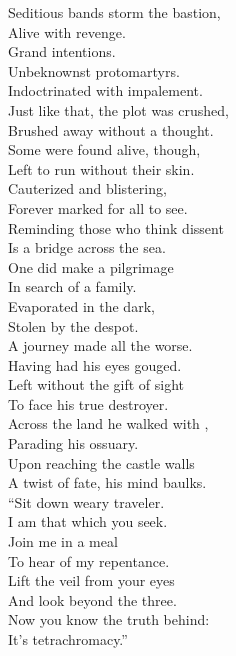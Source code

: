Seditious bands storm the bastion, \\
Alive with revenge. \\
Grand intentions. \\
Unbeknownst protomartyrs. \\
Indoctrinated with impalement. \\

Just like that, the plot was crushed, \\
Brushed away without a thought. \\
Some were found alive, though, \\
Left to run without their skin. \\
Cauterized and blistering, \\
Forever marked for all to see. \\
Reminding those who think dissent \\
Is a bridge across the sea. \\

One did make a pilgrimage \\
In search of a family. \\
Evaporated in the dark, \\
Stolen by the despot. \\
A journey made all the worse. \\
Having had his eyes gouged. \\
Left without the gift of sight \\
To face his true destroyer. \\

Across the land he walked with , \\
Parading his ossuary. \\
Upon reaching the castle walls \\
A twist of fate, his mind baulks. \\

``Sit down weary traveler. \\
I am that which you seek. \\
Join me in a meal \\
To hear of my repentance. \\
Lift the veil from your eyes \\
And look beyond the three. \\
Now you know the truth behind: \\
It's tetrachromacy.'' \\


